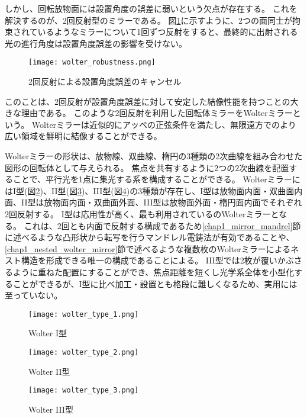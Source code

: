 しかし、回転放物面には設置角度の誤差に弱いという欠点が存在する。
これを解決するのが、2回反射型のミラーである。
図\ref{fig:wolter_robustness}に示すように、2つの面同士が拘束されているようなミラーについて1回ずつ反射をすると、最終的に出射される光の進行角度は設置角度誤差の影響を受けない。

\begin{figure}[b]
\centering
\texttt{[image: wolter\_robustness.png]}
\caption{2回反射による設置角度誤差のキャンセル}
\label{fig:wolter_robustness}
\end{figure}

このことは、2回反射が設置角度誤差に対して安定した結像性能を持つことの大きな理由である。
このような2回反射を利用した回転体ミラーをWolterミラーという。
Wolterミラーは近似的にアッベの正弦条件を満たし、無限遠方でのより広い領域を鮮明に結像することができる。\cite{VanSpeybroeck1972}

Wolterミラーの形状は、放物線、双曲線、楕円の3種類の2次曲線を組み合わせた図形の回転体として与えられる。
焦点を共有するように2つの2次曲線を配置することで、平行光を1点に集光する系を構成することができる。
WolterミラーにはI型(図\ref{fig:wolter_type_1})、II型(図\ref{fig:wolter_type_2})、III型(図\ref{fig:wolter_type_3})の3種類が存在し、I型は放物面内面・双曲面内面、II型は放物面内面・双曲面外面、III型は放物面外面・楕円面内面でそれぞれ2回反射する。
I型は応用性が高く、最も利用されているのWolterミラーとなる。
これは、2回とも内面で反射する構成であるため\ref{chap1_mirror_mandrel}節に述べるような凸形状から転写を行うマンドレル電鋳法が有効であることや、\ref{chap1_nested_wolter_mirror}節で述べるような複数枚のWolterミラーによるネスト構造を形成できる唯一の構成であることによる。
III型では2枚が覆いかぶさるように重ねた配置にすることができ、焦点距離を短くし光学系全体を小型化することができるが、I型に比べ加工・設置とも格段に難しくなるため、実用には至っていない。

\begin{figure}[b]
\centering
\texttt{[image: wolter\_type\_1.png]}
\caption{Wolter I型}
\label{fig:wolter_type_1}
\end{figure}

\begin{figure}[b]
\centering
\texttt{[image: wolter\_type\_2.png]}
\caption{Wolter II型}
\label{fig:wolter_type_2}
\end{figure}

\begin{figure}[b]
\centering
\texttt{[image: wolter\_type\_3.png]}
\caption{Wolter III型}
\label{fig:wolter_type_3}
\end{figure}

